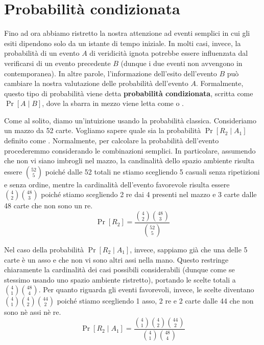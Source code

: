 \documentclass[a4paper, 12pt]{report}
\begin{document}
    \section{Probabilità condizionata}

    Fino ad ora abbiamo ristretto la nostra attenzione ad eventi semplici in cui gli esiti dipendono solo da un istante di tempo iniziale. In molti casi, invece, la probabilità di un evento $A$ di veridicità ignota potrebbe essere influenzata dal verificarsi di un evento precedente $B$ (dunque i due eventi non avvengono in contemporanea). In altre parole, l'informazione dell'esito dell'evento $B$ può cambiare la nostra valutazione delle probabilità dell'evento $A$. Formalmente, questo tipo di probabilità viene detta \textbf{probabilità condizionata}, scritta come $\Pr[A \mid B]$, dove la sbarra in mezzo viene letta come  o .

    Come al solito, diamo un'intuizione usando la probabilità classica. Consideriamo un mazzo da 52 carte. Vogliamo sapere quale sia la probabilità $\Pr[R_2 \mid A_1]$ definito come . Normalmente, per calcolare la probabilità dell'evento  procederemmo considerando le combinazioni semplici. In particolare, assumendo che non vi siano imbrogli nel mazzo, la candinalità dello spazio ambiente risulta essere $\binom{52}{5}$ poiché dalle 52 totali ne stiamo scegliendo 5 casuali senza ripetizioni e senza ordine, mentre la cardinalità dell'evento favorevole risulta essere $\binom{4}{2}\binom{48}{3}$ poiché stiamo scegliendo 2 re dai 4 presenti nel mazzo e 3 carte dalle 48 carte che non sono un re.
    \[\Pr[R_2] = \frac{\binom{4}{2}\binom{48}{3}}{\binom{52}{5}}\]

    Nel caso della probabilità $\Pr[R_2 \mid A_1]$, invece, sappiamo già che una delle 5 carte è un asso e che non vi sono altri assi nella mano. Questo restringe chiaramente la cardinalità dei casi possibili considerabili (dunque come se stessimo usando uno spazio ambiente ristretto), portando le scelte totali a $\binom{4}{1}\binom{48}{4}$. Per quanto riguarda gli eventi favorevoli, invece, le scelte diventano $\binom{4}{1} \binom{4}{2} \binom{44}{2}$ poiché stiamo scegliendo 1 asso, 2 re e 2 carte dalle 44 che non sono nè assi nè re.
    \[\Pr[R_2 \mid A_1] = \frac{\binom{4}{1} \binom{4}{2} \binom{44}{2}}{\binom{4}{1} \binom{48}{4}}\]
\end{document}
